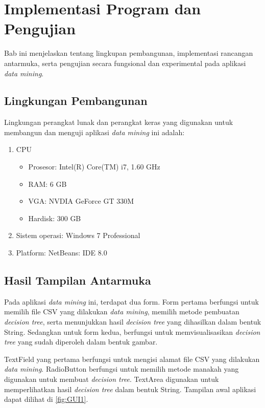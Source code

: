 \chapter{Implementasi Program dan Pengujian}

Bab ini menjelaskan tentang lingkupan pembangunan, implementasi rancangan antarmuka, serta pengujian secara fungsional dan experimental pada aplikasi \textsl{data mining}.

\section{Lingkungan Pembangunan}
Lingkungan perangkat lunak dan perangkat keras yang digunakan untuk membangun dan menguji aplikasi \textsl{data mining} ini adalah:

\begin{enumerate}
	\item CPU
	\begin{itemize}
		\item Prosesor: Intel(R) Core(TM) i7, 1.60 GHz
		\item RAM: 6 GB
		\item VGA: NVDIA GeForce GT 330M
		\item Hardisk: 300 GB
	\end{itemize}
	\item Sistem operasi: Windows 7 Professional
	\item Platform: NetBeans: IDE 8.0
\end{enumerate}

\section{Hasil Tampilan Antarmuka}
Pada aplikasi \textsl{data mining} ini, terdapat dua form. Form pertama berfungsi untuk memilih file CSV yang dilakukan \textsl{data mining}, memilih metode pembuatan \textsl{decision tree}, serta menunjukkan hasil \textsl{decision tree} yang dihasilkan dalam bentuk String. Sedangkan untuk form kedua, berfungsi untuk memvisualisasikan \textsl{decision tree} yang sudah diperoleh dalam bentuk gambar.

TextField yang pertama berfungsi untuk mengisi alamat file CSV yang dilakukan \textsl{data mining}. RadioButton berfungsi untuk memilih metode manakah yang digunakan untuk membuat \textsl{decision tree}. TextArea digunakan untuk memperlihatkan hasil \textsl{decision tree} dalam bentuk String. Tampilan awal aplikasi dapat dilihat di \ref{fig:GUI1}.

